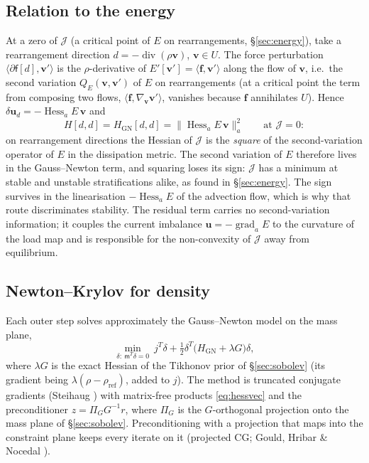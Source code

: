 \documentclass[11pt]{article}
\newcommand{\Jf}{\mathscr{J}}  %
\newcommand{\bu}{\mathbf{u}}
\newcommand{\bv}{\mathbf{v}}
\newcommand{\bff}{\mathbf{f}}
\renewcommand{\div}{\operatorname{div}}
\newcommand{\norm}[1]{\lVert #1 \rVert}
\newcommand{\ip}[2]{\langle #1, #2\rangle}
\begin{document}
\subsection{Relation to the energy}

At a zero of $\Jf $ (a critical point of $E$ on rearrangements,
\S\ref{sec:energy}), take a rearrangement direction $d = -\div(\rho\bv)$,
$\bv \in U$. The force perturbation $\ip{\partial\mathsf{f}[d]}{\bv'}$ is
the $\rho$-derivative of $E'[\bv'] = \ip{\bff}{\bv'}$ along the flow of
$\bv$, i.e.\ the second variation $Q_E(\bv,\bv')$ of $E$ on
rearrangements (at a critical point the term from composing two flows,
$\ip{\bff}{\nabla_{\bv}\bv'}$, vanishes because $\bff$ annihilates $U$).
Hence $\delta\bu_d = -\operatorname{Hess}_aE\,\bv$ and
\begin{equation}
  H[d,d] = H_{\mathrm{GN}}[d,d] = \norm{\operatorname{Hess}_aE\,\bv}_a^{2}
  \qquad\text{at } \Jf  = 0 :
\end{equation}
on rearrangement directions the Hessian of $\Jf $ is the \emph{square} of the
second-variation operator of $E$ in the dissipation metric. The second
variation of $E$ therefore lives in the Gauss--Newton term, and squaring
loses its sign: $\Jf $ has a minimum at stable and unstable stratifications
alike, as found in \S\ref{sec:energy}. The sign survives in the
linearisation $-\operatorname{Hess}_aE$ of the advection flow, which is
why that route discriminates stability. The residual term carries no
second-variation information; it couples the current imbalance $\bu =
-\operatorname{grad}_aE$ to the curvature of the load map and is
responsible for the non-convexity of $\Jf $ away from equilibrium.

\subsection{Newton--Krylov for density}
\label{sec:newton-krylov}

Each outer step solves approximately the Gauss--Newton model on the mass
plane,
\begin{equation}
  \min_{\delta:\ \mathsf{m}^{T}\delta = 0}\
  j^{T}\delta + \tfrac12\delta^{T}\bigl(H_{\mathrm{GN}} + \lambda G\bigr)\delta,
\end{equation}
where $\lambda G$ is the exact Hessian of the Tikhonov prior of
\S\ref{sec:sobolev} (its gradient being $\lambda(\rho - \rho_{\mathrm{ref}})$,
added to $j$). The method is truncated conjugate gradients
(Steihaug \cite{Steihaug1983}) with matrix-free products
\eqref{eq:hessvec} and the preconditioner $z = \Pi_G G^{-1}r$, where
$\Pi_G$ is the $G$-orthogonal projection onto the mass plane of
\S\ref{sec:sobolev}. Preconditioning with a projection that maps into the
constraint plane keeps every iterate on it (projected CG; Gould, Hribar
\& Nocedal \cite{GouldHribarNocedal2001}).
\end{document}
